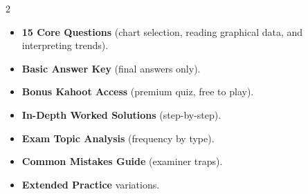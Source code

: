 \documentclass[11pt,a4paper]{article}
\newcommand{\FullReleaseDate}{April 30, 2026}
\begin{document}
\vspace{8pt}

\begin{multicols}{2}
  \begin{tcolorbox}[card, title=\sffamily\bfseries\textcolor{white}{\faHandPointDown\ TODAY (Simplified Version)}, colbacktitle=mainblue, boxed title style={sharp corners, boxrule=0pt}]
    \begin{itemize}[leftmargin=1.2em, itemsep=2pt]
      \item \small \textbf{15 Core Questions} (chart selection, reading graphical data, and interpreting trends).
      \item \small \textbf{Basic Answer Key} (final answers only).
      \item \small \textbf{Bonus Kahoot Access} (premium quiz, free to play).
    \end{itemize}
  \end{tcolorbox}

  \columnbreak

  \begin{tcolorbox}[card, title=\sffamily\bfseries\textcolor{white}{\faRocket\ ON \FullReleaseDate\ (Full Upgrade)}, colbacktitle=mainblue, boxed title style={sharp corners, boxrule=0pt}]
    \begin{itemize}[leftmargin=1.2em, itemsep=2pt]
      \item \small \textbf{In-Depth Worked Solutions} (step-by-step).
      \item \small \textbf{Exam Topic Analysis} (frequency by type).
      \item \small \textbf{Common Mistakes Guide} (examiner traps).
      \item \small \textbf{Extended Practice} variations.
    \end{itemize}
  \end{tcolorbox}
\end{multicols}
\end{document}
